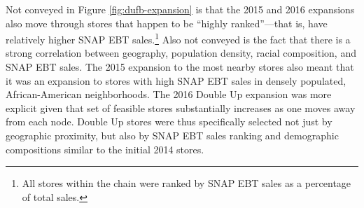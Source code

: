 \documentclass[12pt,letterpaperpaper,]{book}
\begin{document}
Not conveyed in Figure \ref{fig:dufb-expansion} is that the 2015 and
2016 expansions also move through stores that happen to be ``highly
ranked''---that is, have relatively higher SNAP EBT sales.\footnote{All
  stores within the chain were ranked by SNAP EBT sales as a percentage
  of total sales.} Also not conveyed is the fact that there is a strong
correlation between geography, population density, racial composition,
and SNAP EBT sales. The 2015 expansion to the most nearby stores also
meant that it was an expansion to stores with high SNAP EBT sales in
densely populated, African-American neighborhoods. The 2016 Double Up
expansion was more explicit given that set of feasible stores
substantially increases as one moves away from each node. Double Up
stores were thus specifically selected not just by geographic proximity,
but also by SNAP EBT sales ranking and demographic compositions similar
to the initial 2014 stores.
\end{document}
